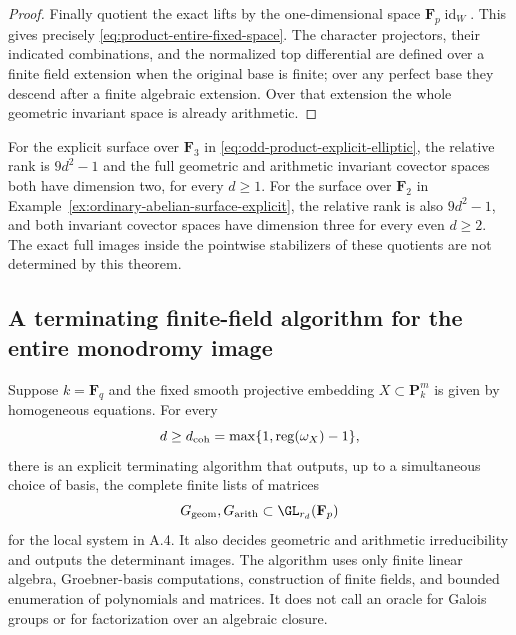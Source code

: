 \begin{proof}
Finally quotient the exact lifts by the one-dimensional
space $\mathbf F_p\operatorname{id}_W$.
This gives precisely \eqref{eq:product-entire-fixed-space}.
The character projectors, their indicated combinations,
and the normalized top differential are defined over
a finite field extension when the original base is
finite; over any perfect base they descend after a
finite algebraic extension.  Over that extension the
whole geometric invariant space is already arithmetic.
\end{proof}

\begin{corollary}\label{cor:product-two-explicit-fixed-spaces}
For the explicit surface over $\mathbf F_3$ in
\eqref{eq:odd-product-explicit-elliptic}, the relative
rank is $9d^2-1$ and the full geometric and arithmetic
invariant covector spaces both have dimension two,
for every $d\geq1$.
For the surface over $\mathbf F_2$ in
Example~\ref{ex:ordinary-abelian-surface-explicit}, the
relative rank is also $9d^2-1$, and both invariant
covector spaces have dimension three for every even
$d\geq2$.
The exact full images inside the pointwise stabilizers
of these quotients are not determined by this theorem.
\end{corollary}


\subsection{A terminating finite-field algorithm for the entire monodromy image}
\label{subsec:effective-entire-monodromy}

\begin{theorem}\label{thm:effective-monodromy-matrices}
Suppose $k=\mathbf F_q$ and the fixed smooth projective
embedding $X\subset\mathbf P^m_k$ is given by homogeneous
equations.  For every
\[
 d\geq d_{\rm coh}=\max\{1,\operatorname{reg}(\omega_X)-1\},
\]
there is an explicit terminating algorithm that outputs,
up to a simultaneous choice of basis, the complete finite
lists of matrices
\[
 G_{\rm geom},G_{\rm arith}\subset\GL_{r_d}(\mathbf F_p)
\]
for the local system in A.4.  It also decides geometric
and arithmetic irreducibility and outputs the determinant
images.  The algorithm uses only finite linear algebra,
Groebner-basis computations, construction of finite fields,
and bounded enumeration of polynomials and matrices.
It does not call an oracle for Galois groups or for
factorization over an algebraic closure.
\end{theorem}

